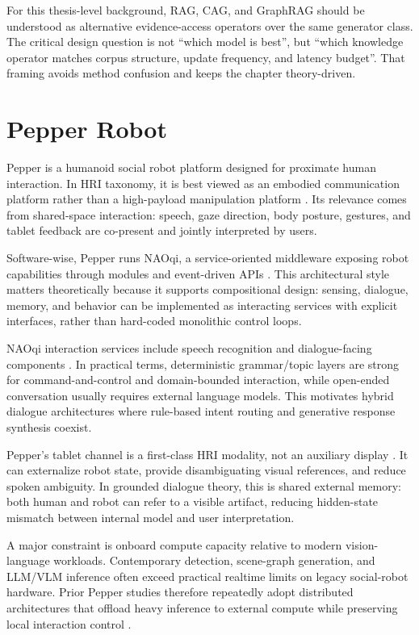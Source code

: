   For this thesis-level background, RAG, CAG, and GraphRAG should be understood as alternative evidence-access operators over the same generator class. The critical design question is not \enquote{which
  model is best}, but \enquote{which knowledge operator matches corpus structure, update frequency, and latency budget}. That framing avoids method confusion and keeps the chapter theory-driven.

  \section{Pepper Robot}

  Pepper is a humanoid social robot platform designed for proximate human interaction. In HRI taxonomy, it is best viewed as an embodied communication platform rather than a high-payload manipulation
  platform \cite{goodrich_human-robot_2007,henschel_what_2021}. Its relevance comes from shared-space interaction: speech, gaze direction, body posture, gestures, and tablet feedback are co-present and
  jointly interpreted by users.

  Software-wise, Pepper runs NAOqi, a service-oriented middleware exposing robot capabilities through modules and event-driven APIs \cite{softbank_python_sdk_2026}. This architectural style matters
  theoretically because it supports compositional design: sensing, dialogue, memory, and behavior can be implemented as interacting services with explicit interfaces, rather than hard-coded monolithic
  control loops.

  NAOqi interaction services include speech recognition and dialogue-facing components \cite{softbank_alspeechrecognition_2026}. In practical terms, deterministic grammar/topic layers are strong for
  command-and-control and domain-bounded interaction, while open-ended conversation usually requires external language models. This motivates hybrid dialogue architectures where rule-based intent routing
  and generative response synthesis coexist.

  Pepper’s tablet channel is a first-class HRI modality, not an auxiliary display \cite{softbank_peppers_tablet_2026}. It can externalize robot state, provide disambiguating visual references, and reduce
  spoken ambiguity. In grounded dialogue theory, this is shared external memory: both human and robot can refer to a visible artifact, reducing hidden-state mismatch between internal model and user
  interpretation.

  A major constraint is onboard compute capacity relative to modern vision-language workloads. Contemporary detection, scene-graph generation, and LLM/VLM inference often exceed practical realtime limits
  on legacy social-robot hardware. Prior Pepper studies therefore repeatedly adopt distributed architectures that offload heavy inference to external compute while preserving local interaction control
  \cite{reyes_near_2018,trinquet_future_2025,brad_retrieval-augmented_2025}.

